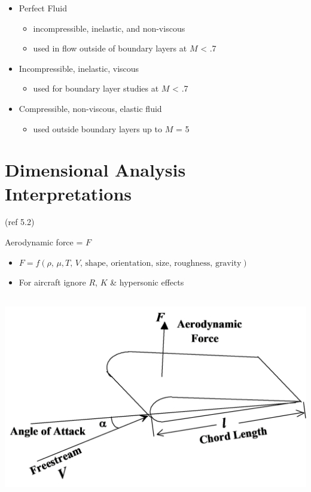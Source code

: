 \documentclass[
]{book}
\providecommand{\tightlist}{%
  \setlength{\itemsep}{0pt}\setlength{\parskip}{0pt}}
\begin{document}
\begin{itemize}
\tightlist
\item
  Perfect Fluid

  \begin{itemize}
  \tightlist
  \item
    incompressible, inelastic, and non-viscous
  \item
    used in flow outside of boundary layers at \(M\) \textless{} .7
  \end{itemize}
\item
  Incompressible, inelastic, viscous

  \begin{itemize}
  \tightlist
  \item
    used for boundary layer studies at \(M\) \textless{} .7
  \end{itemize}
\item
  Compressible, non-viscous, elastic fluid

  \begin{itemize}
  \tightlist
  \item
    used outside boundary layers up to \(M\) = 5
  \end{itemize}
\end{itemize}

\hypertarget{dimensional-analysis-interpretations}{%
\section{Dimensional Analysis Interpretations}\label{dimensional-analysis-interpretations}}

(ref 5.2)

Aerodynamic force = \(F\)

\begin{itemize}
\tightlist
\item
  \(F = f \left( \rho \text{, } \mu, T \text{, } V \text{, shape, orientation, size, roughness, gravity} \right)\)
\item
  For aircraft ignore \(R\), \(K\) \& hypersonic effects
\end{itemize}

\includegraphics[width=5.8in,height=3.481in]{media/05/image1.svg}
\end{document}
